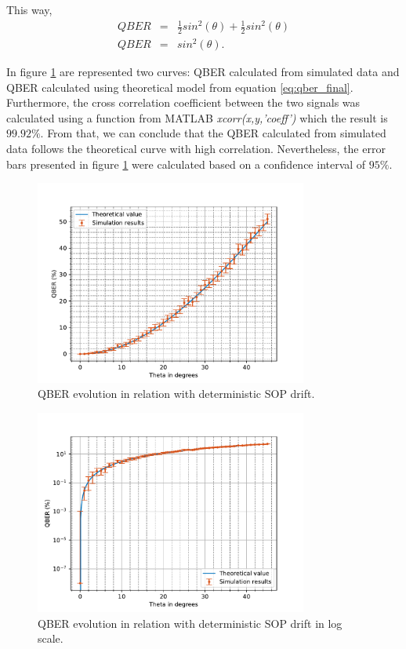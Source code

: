 \begin{refsection}
This way,
\begin{eqnarray}\label{eq:qber_final}
   QBER & = & \frac{1}{2}sin^2(\theta)+ \frac{1}{2}sin^2(\theta)\\
   QBER & = & sin^2(\theta).
\end{eqnarray}

 In figure \ref{qber} are represented two curves: QBER calculated from simulated data and QBER calculated using theoretical model from equation \ref{eq:qber_final}. Furthermore, the cross correlation coefficient between the two signals was calculated using a function from MATLAB \textit{xcorr(x,y,'coeff')} which the result is $99.92\%$. From that, we can conclude that the QBER calculated from simulated data follows the theoretical curve with high correlation. Nevertheless, the error bars presented in figure \ref{qber} were calculated based on a confidence interval of $95\%$.

\begin{figure}[h]
    \centering
        \includegraphics[clip, trim=0.5cm 0.0cm 0.5cm 1cm, width=0.80\textwidth]{./sdf/bb84_with_discrete_variables/figures/QBER_vs_theta_normal_scale.pdf}
    \caption{QBER evolution in relation with deterministic SOP drift.}\label{qber}
\end{figure}

\begin{figure}[H]
    \centering
        \includegraphics[clip, trim=0.2cm 0.0cm 0.5cm 1cm, width=0.80\textwidth]{./sdf/bb84_with_discrete_variables/figures/qber_vs_theta_all.pdf}
    \caption{QBER evolution in relation with deterministic SOP drift in log scale.}\label{qber_log}
\end{figure}


\end{refsection}
